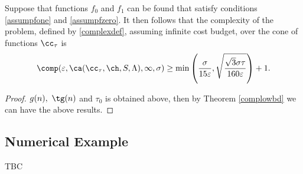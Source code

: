 \begin{theorem} \label{complowbdinteg} Suppose that functions $f_{0}$ and $f_1$ can be found that satisfy conditions \eqref{assumpfone} and \eqref{assumpfzero}.  It then follows that the complexity of the problem, defined by \eqref{complexdef}, assuming infinite cost budget, over the cone of functions $\cc_{\tau}$ is
$$
\comp(\varepsilon,\ca(\cc_{\tau},\ch,S,\Lambda),\infty,\sigma)
\ge \min\left(\frac{\sigma}{15\varepsilon},\sqrt{\frac{\sqrt{3}\sigma\tau}{160\varepsilon}}\right)+1.
$$
\end{theorem}

\begin{proof}
$g(n), \ \tg(n)$ and $\tau_0$ is obtained above, then by Theorem \ref{complowbd}
we can have the above results.
\end{proof}

\subsection{Numerical Example}
TBC
% 